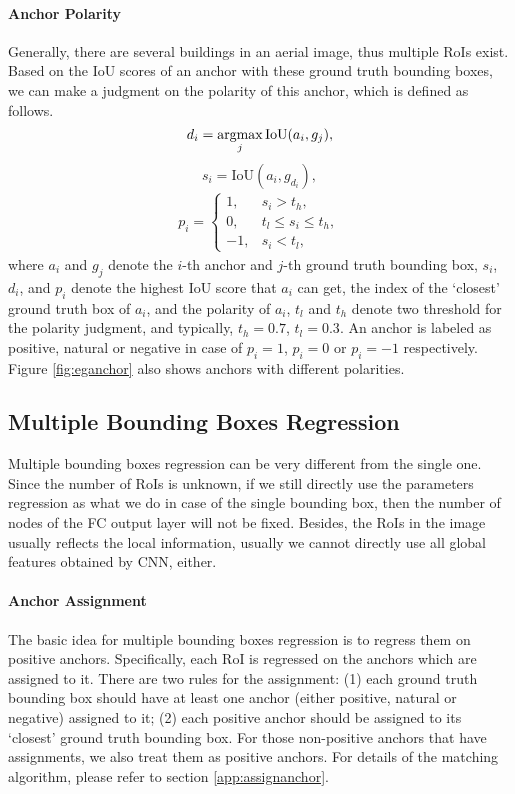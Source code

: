 

\paragraph{Anchor Polarity}
Generally, there are several buildings in an aerial image, thus multiple RoIs exist. Based on the IoU scores of an anchor with these ground truth bounding boxes, we can make a judgment on the polarity of this anchor, which is defined as follows.
\begin{equation}
	d_i = \operatorname*{argmax}_{j} \text{IoU}(a_i, g_j),
\end{equation}
\begin{equation}
	s_i = \text{IoU}(a_i, g_{d_i}),
\end{equation}
\begin{equation}
\begin{aligned}
	p_i = \begin{cases}
		1, & s_i > t_h, \\
		0, & t_l \leqslant s_i \leqslant t_h,\\
		-1, & s_i < t_l,
	\end{cases}
\end{aligned}
\end{equation}
where $a_i$ and $g_j$ denote the $i$-th anchor and $j$-th ground truth bounding box, $s_i$, $d_i$, and $p_i$ denote the highest IoU score that $a_i$ can get, the index of the `closest' ground truth box of $a_i$, and the polarity of $a_i$, $t_l$ and $t_h$ denote two threshold for the polarity judgment, and typically, $t_h = 0.7$, $t_l = 0.3$. An anchor is labeled as positive, natural or negative in case of $p_i = 1$, $p_i = 0$ or $p_i = -1$ respectively. Figure \ref{fig:eganchor} also shows anchors with different polarities.

\subsection{Multiple Bounding Boxes Regression}\label{mulbboxreg}
Multiple bounding boxes regression can be very different from the single one. Since the number of RoIs is unknown, if we still directly use the parameters regression as what we do in case of the single bounding box, then the number of nodes of the FC output layer will not be fixed. Besides, the RoIs in the image usually reflects the local information, usually we cannot directly use all global features obtained by CNN, either.

\paragraph{Anchor Assignment}
The basic idea for multiple bounding boxes regression is to regress them on positive anchors. Specifically, each RoI is regressed on the anchors which are assigned to it. There are two rules for the assignment: (1) each ground truth bounding box should have at least one anchor (either positive, natural or negative) assigned to it; (2) each positive anchor should be assigned to its `closest' ground truth bounding box. For those non-positive anchors that have assignments, we also treat them as positive anchors. For details of the matching algorithm, please refer to section \ref{app:assignanchor}.

